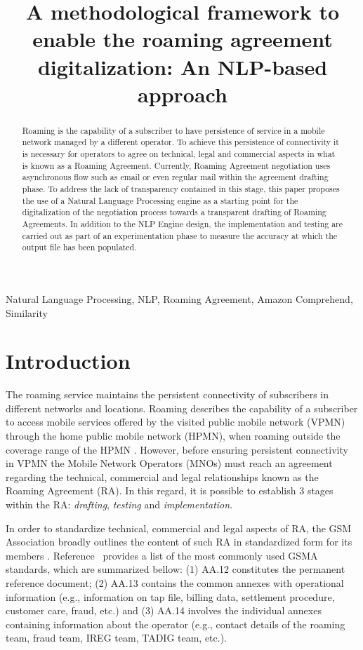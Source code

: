 \documentclass[conference]{style/IEEEtran}
\begin{document}
\title{A methodological framework to enable the roaming agreement digitalization: An NLP-based approach\\}

\maketitle

\begin{abstract}
Roaming is the capability of a subscriber to have persistence of service in a mobile network managed by a different operator. To achieve this persistence of connectivity it is necessary for operators to agree on technical, legal and commercial aspects in what is known as a Roaming Agreement. Currently, Roaming Agreement negotiation uses asynchronous flow such as email or even regular mail within the agreement drafting phase. To address the lack of transparency contained in this stage, this paper proposes the use of a Natural Language Processing engine as a starting point for the digitalization of the negotiation process towards a transparent drafting of Roaming Agreements. In addition to the NLP Engine design, the implementation and testing are carried out as part of an experimentation phase to measure the accuracy at which the output file has been populated.
\end{abstract}

\begin{IEEEkeywords}
Natural Language Processing, NLP, Roaming Agreement, Amazon Comprehend, Similarity
\end{IEEEkeywords}

\section{Introduction}
The roaming service maintains the persistent connectivity of subscribers in different networks and locations. Roaming describes the capability of a subscriber to access mobile services offered by the visited public mobile network (VPMN) through the home public mobile network (HPMN), when roaming outside the coverage range of the HPMN \cite{Tanaka2013}. However, before ensuring persistent connectivity in VPMN the Mobile Network Operators (MNOs) must reach an agreement regarding the technical, commercial and legal relationships known as the Roaming Agreement (RA). In this regard, it is possible to establish 3 stages within the RA: \textit{drafting}, \textit{testing} and \textit{implementation}.

In order to standardize technical, commercial and legal aspects of RA, the GSM Association broadly outlines the content of such RA in standardized form for its members \cite{Ferwerda2018}. Reference~\cite{ROCCO2017} provides a list of the most commonly used GSMA standards, which are summarized bellow: (1) AA.12 constitutes the permanent reference document; (2) AA.13 contains the common annexes with operational information (e.g., information on tap file, billing data, settlement procedure, customer care, fraud, etc.) and (3) AA.14 involves the individual annexes containing information about the operator (e.g., contact details of the roaming team, fraud team, IREG team, TADIG team, etc.).
\end{document}
